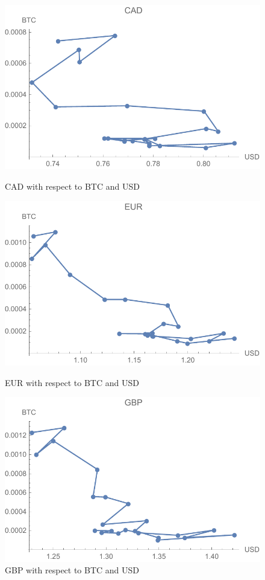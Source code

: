 
\begin{figure}[!htb]
	\includegraphics[width=\linewidth]{figures/cad.pdf}
	\caption{CAD with respect to BTC and USD}\label{fig:cad}
	\endminipage\hfill
	\includegraphics[width=\linewidth]{figures/eur.pdf}
	\caption{EUR with respect to BTC and USD}\label{fig:eur}
	\endminipage\hfill
	\includegraphics[width=\linewidth]{figures/gbp.pdf}
	\caption{GBP with respect to BTC and USD}\label{fig:gbp}
	\endminipage
\end{figure}

